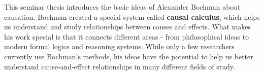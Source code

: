 \documentclass[seminar,palatino,english]{AIGpaper}
\newcommand{\ignore}[1]{}
\begin{document}
This seminar thesis introduces the basic ideas of Alexander Bochman about causation. Bochman created a special system called \textbf{causal calculus}, which helps us understand and study relationships between causes and effects. What makes his work special is that it connects different areas - from philosophical ideas to modern formal logics and reasoning systems. While only a few researchers currently use Bochman's methods, his ideas have the potential to help us better understand cause-and-effect relationships in many different fields of study.


\ignore{
    \begin{itemize}
        \item Basis for integrating Pearl.
        \item Asymmetry between language/semantics.
        \item Holistic view of propositions.
    \end{itemize}
}



\newpage
{\footnotesize
    \printbibliography
}

\end{document}
